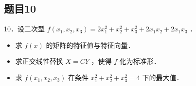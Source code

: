 \documentclass{article}
\begin{document}
\subsection{题目10}
10．设二次型 \(f\left(x_{1}, x_{2}, x_{3}\right)=2 x_{1}^{2}+x_{2}^{2}+x_{3}^{2}+2 x_{1} x_{2}+2 x_{1} x_{3}\) ．

\begin{itemize}
  \item[（1）] 求 \(f(x)\) 的矩阵的特征值与特征向量．
  \item[（2）] 求正交线性替换 \(X=C Y\) ，使得 \(f\) 化为标准形．
  \item[（3）] 求 \(f\left(x_{1}, x_{2}, x_{3}\right)\) 在条件 \(x_{1}^{2}+x_{2}^{2}+x_{3}^{2}=4\) 下的最大值．
\end{itemize}
\end{document}
